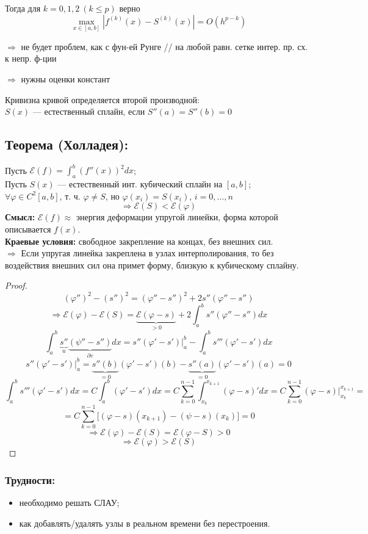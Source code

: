 Тогда для $k = 0, 1, 2 ~ (k \leq p )$ верно
\[
\max_{x \in [a, b]} |f^{(k)}(x) - S^{(k)}(x)| = O(h^{p-k})
\]

$\Rightarrow$ не будет проблем, как с фун-ей Рунге \quad // на любой равн. сетке интер. пр. сх. к непр. ф-ции

$\Rightarrow$ нужны оценки констант

Кривизна кривой определяется второй производной: \\
$S(x)$ --- естественный сплайн, если $S''(a) = S''(b) = 0$

\subsection*{Теорема (Холладея):}
Пусть $\mathcal{E}(f) = \int_a^b \left(f''(x)\right)^2 dx$; \\
Пусть $S(x)$ — естественный инт. кубический сплайн на $[a, b]$; \\
$\forall \varphi \in C^2[a, b]$, т. ч. $\varphi \neq S$, но $\varphi(x_i) = S(x_i)$, $i = 0, \ldots, n$ \\
\[
\Rightarrow \mathcal{E}(S) < \mathcal{E}(\varphi)
\]
\textbf{Смысл:} $\mathcal{E}(f) \approx$ энергия деформации упругой линейки, форма которой описывается $f(x)$. \\
\textbf{Краевые условия:} свободное закрепление на концах, без внешних сил. \\
$\Rightarrow$ Если упругая линейка закреплена в узлах интерполирования, то без воздействия внешних сил она примет форму, близкую к кубическому сплайну.

\begin{proof}
\[
(\varphi'')^2 - (s'')^2 = (\varphi'' - s'')^2 + 2s''(\varphi'' - s'')
\]
\[
\Rightarrow \mathcal{E}(\varphi) - \mathcal{E}(S) =\underbrace{\mathcal{E}(\varphi - s)}_{>0} + 2\int_a^b s''(\varphi'' - s'') dx
\]
\[
\int_a^b \underbrace{s''}_{u} \underbrace{(\psi'' - s'')}_{\partial v} dx = s''(\varphi' - s') \big|_a^b - \int_a^b s''' (\varphi' - s') dx
\]
\[
s''(\varphi' - s') \big|_a^b = \underbrace{s''(b)}_{=0} (\varphi' - s')(b) - \underbrace{s''(a)}_{=0} (\varphi' - s')(a) = 0
\]
\[
\int_a^b s''' (\varphi' - s') dx = C \int^b_a (\varphi' - s') dx = C \sum_{k=0}^{n-1} \int_{x_k}^{x_{k+1}} (\varphi - s)' dx = C \sum_{k=0}^{n-1} (\varphi - s) \big|_{x_k}^{x_{k+1}}=
\]
\[
= C \sum_{k=0}^{n-1} \big[(\varphi - s)(x_{k+1}) - (\psi - s)(x_k) \big] = 0
\]
\[
\Rightarrow \mathcal{E}(\varphi) - \mathcal{E}(S) = \mathcal{E}(\varphi - S) > 0
\]
\[
\Rightarrow \mathcal{E}(\varphi) > \mathcal{E}(S)
\]
\end{proof}

\subsubsection*{Трудности:}
\begin{itemize}
    \item необходимо решать СЛАУ;
    \item как добавлять/удалять узлы в реальном времени без перестроения.
\end{itemize}
